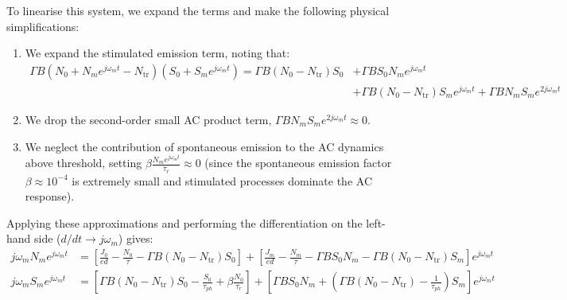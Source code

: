 To linearise this system, we expand the terms and make the following physical simplifications:
\begin{enumerate}
    \item We expand the stimulated emission term, noting that:
    \begin{align*}
        \Gamma B(N_0 + N_m e^{j\omega_m t} - N_\text{tr})(S_0 + S_m e^{j\omega_m t}) = \Gamma B(N_0 - N_\text{tr})S_0 &+ \Gamma B S_0 N_m e^{j\omega_m t} \\
        &+ \Gamma B(N_0 - N_\text{tr})S_m e^{j\omega_m t} + \Gamma B N_m S_m e^{2j\omega_m t}
    \end{align*}
    \item We drop the second-order small AC product term, $\Gamma B N_m S_m e^{2j\omega_m t} \approx 0$.
    \item We neglect the contribution of spontaneous emission to the AC dynamics above threshold, setting $\beta \frac{N_m e^{j\omega_m t}}{\tau_r} \approx 0$ (since the spontaneous emission factor $\beta \approx 10^{-4}$ is extremely small and stimulated processes dominate the AC response).
\end{enumerate}

Applying these approximations and performing the differentiation on the left-hand side ($d/dt \to j\omega_m$) gives:
\begin{align*}
    j\omega_m N_m e^{j\omega_m t} &= \left[ \frac{J_0}{ed} - \frac{N_0}{\tau} - \Gamma B(N_0 - N_\text{tr})S_0 \right] + \left[ \frac{J_m}{ed} - \frac{N_m}{\tau} - \Gamma B S_0 N_m - \Gamma B(N_0 - N_\text{tr})S_m \right] e^{j\omega_m t} \\[6pt]
    j\omega_m S_m e^{j\omega_m t} &= \left[ \Gamma B(N_0 - N_\text{tr})S_0 - \frac{S_0}{\tau_{ph}} + \beta\frac{N_0}{\tau_r} \right] + \left[ \Gamma B S_0 N_m + \left( \Gamma B(N_0 - N_\text{tr}) - \frac{1}{\tau_{ph}} \right) S_m \right] e^{j\omega_m t}
\end{align*}

